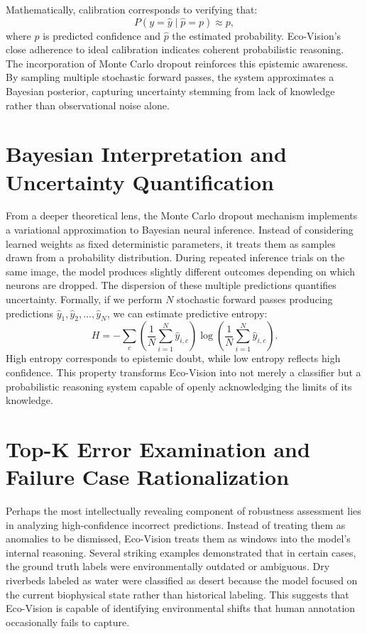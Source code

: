 \documentclass[12pt,a4paper]{report}
\begin{document}
Mathematically, calibration corresponds to verifying that:
\[
P(y = \hat{y} \mid \hat{p} = p) \approx p,
\]
where \(p\) is predicted confidence and \(\hat{p}\) the estimated probability. Eco-Vision's close adherence to ideal calibration indicates coherent probabilistic reasoning. The incorporation of Monte Carlo dropout reinforces this epistemic awareness. By sampling multiple stochastic forward passes, the system approximates a Bayesian posterior, capturing uncertainty stemming from lack of knowledge rather than observational noise alone.

\section{Bayesian Interpretation and Uncertainty Quantification}

From a deeper theoretical lens, the Monte Carlo dropout mechanism implements a variational approximation to Bayesian neural inference. Instead of considering learned weights as fixed deterministic parameters, it treats them as samples drawn from a probability distribution. During repeated inference trials on the same image, the model produces slightly different outcomes depending on which neurons are dropped. The dispersion of these multiple predictions quantifies uncertainty. Formally, if we perform \(N\) stochastic forward passes producing predictions \(\hat{y}_1, \hat{y}_2, ..., \hat{y}_N\), we can estimate predictive entropy:
\[
H = - \sum_{c} \left(\frac{1}{N} \sum_{i=1}^{N} \hat{y}_{i,c}\right) \log \left(\frac{1}{N} \sum_{i=1}^{N} \hat{y}_{i,c}\right).
\]
High entropy corresponds to epistemic doubt, while low entropy reflects high confidence. This property transforms Eco-Vision into not merely a classifier but a probabilistic reasoning system capable of openly acknowledging the limits of its knowledge.

\section{Top-K Error Examination and Failure Case Rationalization}

Perhaps the most intellectually revealing component of robustness assessment lies in analyzing high-confidence incorrect predictions. Instead of treating them as anomalies to be dismissed, Eco-Vision treats them as windows into the model’s internal reasoning. Several striking examples demonstrated that in certain cases, the ground truth labels were environmentally outdated or ambiguous. Dry riverbeds labeled as water were classified as desert because the model focused on the current biophysical state rather than historical labeling. This suggests that Eco-Vision is capable of identifying environmental shifts that human annotation occasionally fails to capture.
\end{document}
